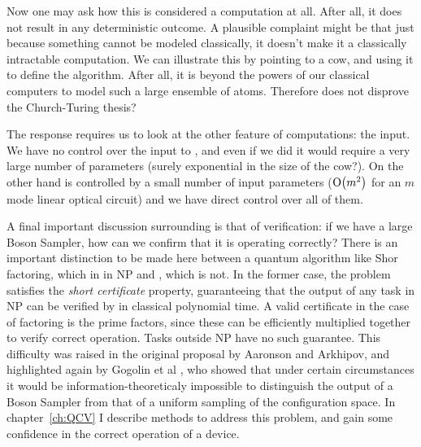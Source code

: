 Now one may ask how this is considered a computation at all.
After all, it does not result in any deterministic outcome. A plausible
complaint might be that just because something cannot be modeled classically,
it doesn't make it a classically intractable computation. We can illustrate
this by pointing to a cow, and using it to define the  algorithm.
After all, it is beyond the powers of our classical computers to model such a
large ensemble of atoms. Therefore does  not disprove the
Church-Turing thesis?

The response requires us to look at the other feature of computations: the
input. We have no control over the input to , and even if we did it
would require a very large number of parameters (surely exponential in the size
of the cow?). On the other hand \bosonsampling{} is controlled by a small number
of input parameters (\(\mathrm{O} \!\left(m^{2}\right)\) for an \(m\) mode linear optical
circuit) and we have direct control over all of them.

A final important discussion surrounding \bosonsampling{} is that of
verification: if we have a large Boson Sampler, how can we confirm that it is
operating correctly? There is an important distinction to be made here between
a quantum algorithm like Shor factoring, which in in NP and \bosonsampling{},
which is not. In the former case, the problem satisfies the \emph{short
certificate} property, guaranteeing that the output of any task in NP can be
verified by in classical polynomial time. A valid certificate in the case of
factoring is the prime factors, since these can be efficiently multiplied
together to verify correct operation. Tasks outside NP have no such guarantee.
This difficulty was raised in the original proposal by Aaronson and Arkhipov,
and highlighted again by Gogolin et al \cite{gogolin}, who showed that under
certain circumstances it would be information-theoreticaly impossible to
distinguish the output of a Boson Sampler from that of a uniform sampling of the
configuration space. In chapter~\ref{ch:QCV} I describe methods to address this
problem, and gain some confidence in the correct operation of a \bosonsampling{}
device.

